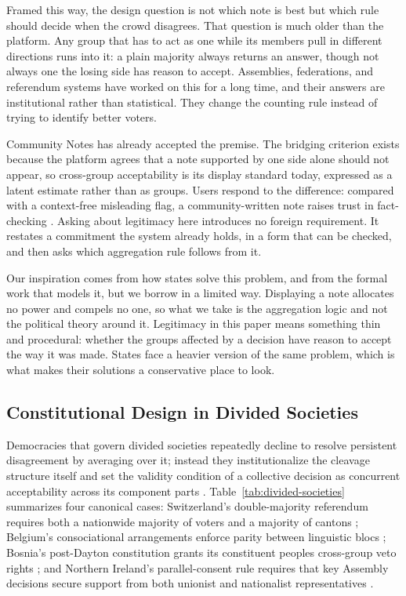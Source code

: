 \documentclass[10pt,twocolumn]{article}
\begin{document}
Framed this way, the design question is not which note is best but which rule
should decide when the crowd disagrees. That question is much older than the
platform. Any group that has to act as one while its members pull in different
directions runs into it: a plain majority always returns an answer, though not
always one the losing side has reason to accept. Assemblies, federations, and
referendum systems have worked on this for a long time, and their answers are
institutional rather than statistical. They change the counting rule instead of
trying to identify better voters.

Community Notes has already accepted the premise. The bridging criterion exists
because the platform agrees that a note supported by one side alone should not
appear, so cross-group acceptability is its display standard today, expressed as
a latent estimate rather than as groups. Users respond to the difference:
compared with a context-free misleading flag, a community-written note raises
trust in fact-checking \citep{drolsbach2024trust}. Asking about legitimacy here
introduces no foreign requirement. It restates a commitment the system already
holds, in a form that can be checked, and then asks which aggregation rule
follows from it.

Our inspiration comes from how states solve this problem, and from the formal
work that models it, but we borrow in a limited way. Displaying a note allocates
no power and compels no one, so what we take is the aggregation logic and not
the political theory around it. Legitimacy in this paper means something thin
and procedural: whether the groups affected by a decision have reason to accept
the way it was made. States face a heavier version of the same problem, which is
what makes their solutions a conservative place to look.

\subsection*{Constitutional Design in Divided Societies}

Democracies that govern divided societies repeatedly decline to resolve
persistent disagreement by averaging over it; instead they institutionalize the
cleavage structure itself and set the validity condition of a collective
decision as concurrent acceptability across its component parts
\citep{lijphart1977democracy}. Table~\ref{tab:divided-societies} summarizes four
canonical cases: Switzerland's double-majority referendum requires both a
nationwide majority of voters and a majority of cantons \citep{lindermueller2021};
Belgium's consociational arrangements enforce parity between linguistic blocs
\citep{lijphart1977democracy}; Bosnia's post-Dayton constitution grants its
constituent peoples cross-group veto rights \citep{bieber2006}; and Northern
Ireland's parallel-consent rule requires that key Assembly decisions secure
support from both unionist and nationalist representatives
\citep{mcgarryoleary2009}.
\end{document}
